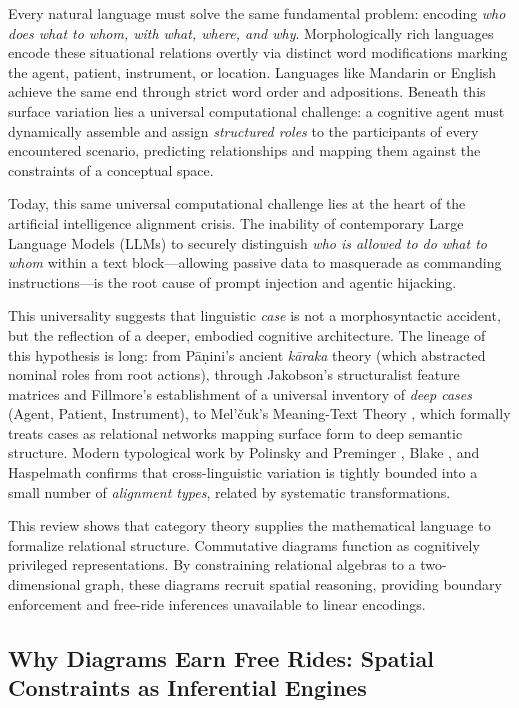 \documentclass[
]{article}
\begin{document}
Every natural language must solve the same fundamental problem: encoding
\emph{who does what to whom, with what, where, and why}. Morphologically
rich languages encode these situational relations overtly via distinct
word modifications marking the agent, patient, instrument, or location.
Languages like Mandarin or English achieve the same end through strict
word order and adpositions. Beneath this surface variation lies a
universal computational challenge: a cognitive agent must dynamically
assemble and assign \emph{structured roles} to the participants of every
encountered scenario, predicting relationships and mapping them against
the constraints of a conceptual space.

Today, this same universal computational challenge lies at the heart of
the artificial intelligence alignment crisis. The inability of
contemporary Large Language Models (LLMs) to securely distinguish
\emph{who is allowed to do what to whom} within a text block---allowing
passive data to masquerade as commanding instructions---is the root
cause of prompt injection and agentic hijacking.

This universality suggests that linguistic \emph{case} is not a
morphosyntactic accident, but the reflection of a deeper, embodied
cognitive architecture. The lineage of this hypothesis is long: from
Pāṇini's ancient \emph{kāraka} theory (which abstracted nominal roles
from root actions), through Jakobson's structuralist feature matrices
and Fillmore's \citeyearpar{fillmore1968case} establishment of a
universal inventory of \emph{deep cases} (Agent, Patient, Instrument),
to Mel'čuk's Meaning-Text Theory \citeyearpar{melcuk1988dependency},
which formally treats cases as relational networks mapping surface form
to deep semantic structure. Modern typological work by Polinsky and
Preminger \citeyearpar{polinsky2015case}, Blake
\citeyearpar{blake2001grammatical}, and Haspelmath
\citeyearpar{haspelmath2009universality} confirms that cross-linguistic
variation is tightly bounded into a small number of \emph{alignment
types}, related by systematic transformations.

This review shows that category theory supplies the mathematical
language to formalize relational structure. Commutative diagrams
function as cognitively privileged representations. By constraining
relational algebras to a two-dimensional graph, these diagrams recruit
spatial reasoning, providing boundary enforcement and free-ride
inferences unavailable to linear encodings.

\subsection{Why Diagrams Earn Free Rides: Spatial Constraints as
Inferential
Engines}\label{why-diagrams-earn-free-rides-spatial-constraints-as-inferential-engines}
\end{document}
